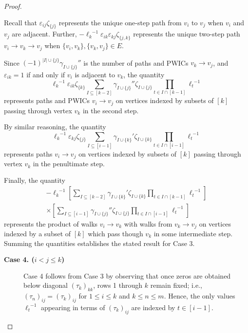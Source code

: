 \documentclass[10pt,a4paper]{amsart}
\begin{document}
\begin{proof}
\begin{description}
Recall that $\varepsilon_{ij}\zeta_{\{j\}}$ represents the unique one-step path from $v_i$ to $v_j$ when $v_i$ and $v_j$ are adjacent.  Further, $-{\ell_k}^{-1}\varepsilon_{ik}\varepsilon_{kj}\zeta_{\{j,k\}}$ represents the unique two-step path $v_i\to v_k\to v_j$ when $\{v_i,v_k\}, \{v_k,v_j\}\in E$.  

Since $(-1)^{|I|\cup\{j\}}{\gamma_{I\cup\{j\}}}''$ is the number of paths and PWICs $v_k\to v_j$, and $\varepsilon_{ik}=1$ if and only if $v_i$ is adjacent to $v_k$, the quantity \begin{equation*}
{\ell_k}^{-1}\varepsilon_{ik}\zeta_{\{k\}}\sum_{I\subseteq [k-2]}{\gamma_{I\cup\{j\}}}''\zeta_{I\cup\{j\}}\prod_{t\in I\cap[k-1]}{\ell_t}^{-1}
\end{equation*}
represents paths and PWICs $v_i\to v_j$ on vertices indexed by subsets of $[k]$ passing through vertex $v_k$ in the second step.

By similar reasoning, the quantity \begin{equation*}
{\ell_k}^{-1}\varepsilon_{kj}\zeta_{\{j\}}\sum_{I\subseteq [i-1]}{\gamma_{I\cup\{k\}}}'\zeta_{I\cup\{k\}}\prod_{t\in I\cap[i-1]}{\ell_t}^{-1}\end{equation*}
represents paths $v_i\to v_j$ on vertices indexed by subsets of $[k]$ passing through vertex $v_k$ in the penultimate step.

Finally, the quantity 
\begin{align*}
-{\ell_k}^{-1}\left[\sum_{I\subseteq [k-2]}{\gamma_{I\cup\{k\}}}'\zeta_{I\cup\{k\}}\prod_{t\in I\cap[k-1]}{\ell_t}^{-1}\right]\\
\times\left[\sum_{I\subseteq [i-1]}{\gamma_{I\cup\{j\}}}''\zeta_{I\cup\{j\}}\prod_{t\in I\cap[i-1]}{\ell_t}^{-1}\right]
\end{align*}
represents the product of walks $v_i\to v_k$ with walks from $v_k\to v_j$ on vertices indexed by a subset of $[k]$ which pass though $v_k$ in some intermediate step.  Summing the quantities establishes the stated result for Case 3.
\end{description}

\begin{description}
\item [{\bf Case 4. ($i<j\le k$)}]
Case 4 follows from Case 3 by observing that once zeros are obtained below diagonal $(\tau_k)_{kk}$, rows 1 through $k$ remain fixed; i.e., $(\tau_n)_{ij}=(\tau_k)_{ij}$ for $1\le i\le k$ and $k\le n\le m$.   Hence, the only values ${\ell_t}^{-1}$ appearing in terms of $(\tau_k)_{ij}$ are indexed by $t\in [i-1]$. 
\end{description}


\end{proof}
\end{document}
